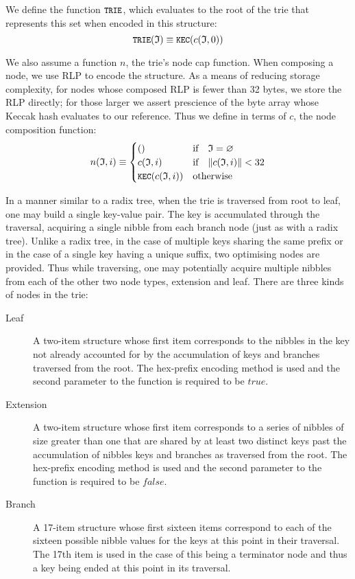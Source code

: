 \documentclass[9pt,oneside]{amsart}
\begin{document}
We define the function $\texttt{\small TRIE}$, which evaluates to the root of the trie that represents this set when encoded in this structure:
\begin{equation}
\texttt{\small TRIE}(\mathfrak{I}) \equiv \texttt{\small KEC}(c(\mathfrak{I}, 0))
\end{equation}

We also assume a function $n$, the trie's node cap function. When composing a node, we use RLP to encode the structure. As a means of reducing storage complexity, for nodes whose composed RLP is fewer than 32 bytes, we store the RLP directly; for those larger we assert prescience of the byte array whose Keccak hash evaluates to our reference. Thus we define in terms of $c$, the node composition function:
\begin{equation}
n(\mathfrak{I}, i) \equiv \begin{cases}
() & \text{if} \quad \mathfrak{I} = \varnothing \\
c(\mathfrak{I}, i) & \text{if} \quad \lVert c(\mathfrak{I}, i)\rVert < 32 \\
\texttt{\small KEC}(c(\mathfrak{I}, i)) & \text{otherwise}
\end{cases}
\end{equation}

In a manner similar to a radix tree, when the trie is traversed from root to leaf, one may build a single key-value pair. The key is accumulated through the traversal, acquiring a single nibble from each branch node (just as with a radix tree). Unlike a radix tree, in the case of multiple keys sharing the same prefix or in the case of a single key having a unique suffix, two optimising nodes are provided. Thus while traversing, one may potentially acquire multiple nibbles from each of the other two node types, extension and leaf. There are three kinds of nodes in the trie:
\begin{description}
\item[Leaf] A two-item structure whose first item corresponds to the nibbles in the key not already accounted for by the accumulation of keys and branches traversed from the root. The hex-prefix encoding method is used and the second parameter to the function is required to be $true$.
\item[Extension] A two-item structure whose first item corresponds to a series of nibbles of size greater than one that are shared by at least two distinct keys past the accumulation of nibbles keys and branches as traversed from the root. The hex-prefix encoding method is used and the second parameter to the function is required to be $false$.
\item[Branch] A 17-item structure whose first sixteen items correspond to each of the sixteen possible nibble values for the keys at this point in their traversal. The 17th item is used in the case of this being a terminator node and thus a key being ended at this point in its traversal.
\end{description}
\end{document}
